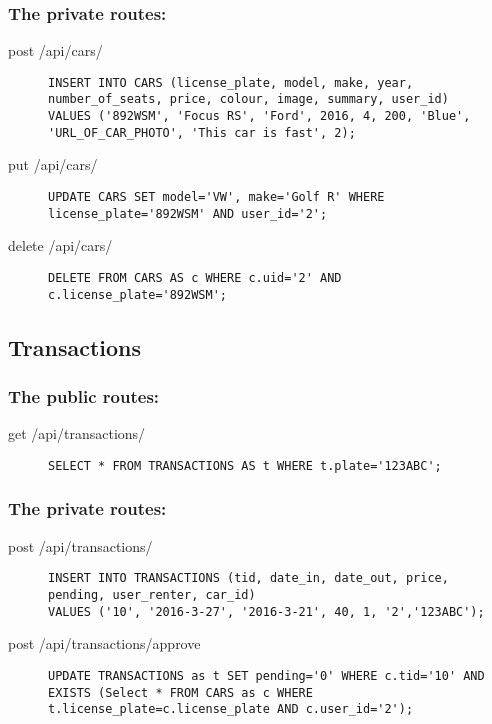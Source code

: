 \documentclass{article}
\begin{document}
\subsubsection{The private routes:}
\begin{description}
\item[post /api/cars/] \mbox{}
\begin{lstlisting}
INSERT INTO CARS (license_plate, model, make, year, number_of_seats, price, colour, image, summary, user_id)
VALUES ('892WSM', 'Focus RS', 'Ford', 2016, 4, 200, 'Blue', 'URL_OF_CAR_PHOTO', 'This car is fast', 2);
\end{lstlisting}
\item[put /api/cars/] \mbox{}
\begin{lstlisting}
UPDATE CARS SET model='VW', make='Golf R' WHERE license_plate='892WSM' AND user_id='2';
\end{lstlisting}
\item[delete /api/cars/] \mbox{}
\begin{lstlisting}
DELETE FROM CARS AS c WHERE c.uid='2' AND c.license_plate='892WSM';
\end{lstlisting}
\end{description}

\subsection{Transactions}
\subsubsection{The public routes:}
\begin{description}
\item[get /api/transactions/] \mbox{}
\begin{lstlisting}
SELECT * FROM TRANSACTIONS AS t WHERE t.plate='123ABC';
\end{lstlisting}
\end{description}

\subsubsection{The private routes:}
\begin{description}
\item[post /api/transactions/] \mbox{}
\begin{lstlisting}
INSERT INTO TRANSACTIONS (tid, date_in, date_out, price, pending, user_renter, car_id)
VALUES ('10', '2016-3-27', '2016-3-21', 40, 1, '2','123ABC');
\end{lstlisting}
\item[post /api/transactions/approve] \mbox{}
\begin{lstlisting}
UPDATE TRANSACTIONS as t SET pending='0' WHERE c.tid='10' AND EXISTS (Select * FROM CARS as c WHERE t.license_plate=c.license_plate AND c.user_id='2');
\end{lstlisting}
\end{description}
\end{document}
